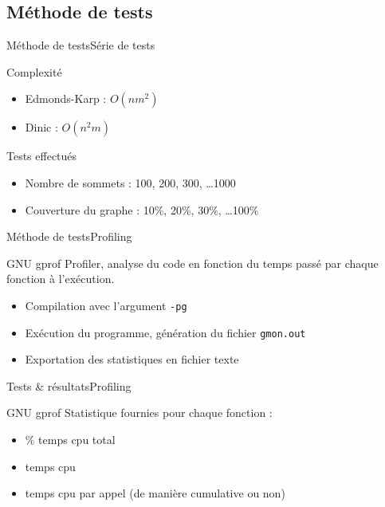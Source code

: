\subsection{Méthode de tests}
\begin{frame}{Méthode de tests}{Série de tests}
\begin{block}{Complexité}
  \begin{itemize}
    \item Edmonds-Karp : $O(nm^2)$
    \item Dinic : $O(n^2m)$
  \end{itemize}
\end{block}
\begin{block}{Tests effectués}
  \begin{itemize}
    \item Nombre de sommets : 100, 200, 300, \ldots 1000
    \item Couverture du graphe : 10\%, 20\%, 30\%, \ldots 100\%
  \end{itemize}
\end{block}
\end{frame}

\begin{frame}{Méthode de tests}{Profiling}
\begin{block}{GNU gprof}
Profiler, analyse du code en fonction du temps passé par chaque fonction à l’exécution.
\begin{itemize}
\item Compilation avec l'argument \texttt{-pg}
\item Exécution du programme, génération du fichier \texttt{gmon.out}
\item Exportation des statistiques en fichier texte
\end{itemize}
\end{block}
\end{frame}

\begin{frame}{Tests \& résultats}{Profiling}
\begin{block}{GNU gprof}
Statistique fournies pour chaque fonction :
\begin{itemize}
\item \% temps cpu total
\item temps cpu
\item temps cpu par appel (de manière cumulative ou non)
\end{itemize}
\end{block}
\end{frame}

